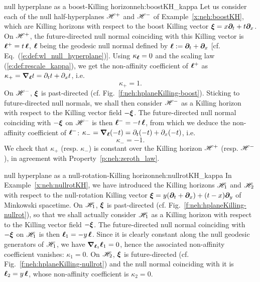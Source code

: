 \begin{texample}{null hyperplane as a boost-Killing horizon}{neh:boostKH_kappa}
Let us consider each of the null half-hyperplanes $\mathscr{H}^+$
and $\mathscr{H}^-$ of Example~\ref{x:neh:boostKH}, which are Killing horizons with
respect to the boost Killing vector $\bm{\xi} = x \bm{\partial}_t + t \bm{\partial}_x$. On
$\mathscr{H}^+$, the future-directed null normal coinciding with this Killing vector
is $\bm{\ell}^+ = t\,  \bm{\ell}$, $\bm{\ell}$ being the geodesic null normal defined by
$\bm{\ell}:= \bm{\partial}_t + \bm{\partial}_x$ [cf. Eq.~(\ref{e:def:wl_null_hyperplane})].
Using $\kappa_{\bm{\ell}} = 0$ and the scaling law (\ref{e:def:rescale_kappa}),
we get the non-affinity
coefficient of $\bm{\ell}^+$ as $\kappa_+= \bm{\nabla}_{\bm{\ell}} t = \partial_t t + \partial_x t$, i.e.
\[
    \kappa_+ = 1 .
\]
On $\mathscr{H}^-$, $\bm{\xi}$ is past-directed (cf. Fig.~\ref{f:neh:hplaneKilling-boost}).
Sticking to future-directed null normals, we shall then consider $\mathscr{H}^-$
as a Killing horizon with respect to the Killing vector field $-\bm{\xi}$.
The future-directed null normal coinciding with $-\bm{\xi}$ on $\mathscr{H}^-$ is then
$\bm{\ell}^- = -t\,  \bm{\ell}$, from which we deduce the non-affinity
coefficient of $\bm{\ell}^-$: $\kappa_-= \bm{\nabla}_{\bm{\ell}} (-t) = \partial_t (-t) + \partial_x (-t)$, i.e.
\[
    \kappa_- = -1 .
\]
We check that $\kappa_+$ (resp.  $\kappa_-$) is constant over the Killing horizon $\mathscr{H}^+$ (resp. $\mathscr{H}^-$), in agreement with Property~\ref{p:neh:zeroth_law}.
\end{texample}

\begin{texample}{null hyperplane as a null-rotation-Killing horizon}{neh:nullrotKH_kappa}
In Example~\ref{x:neh:nullrotKH}, we have introduced the Killing horizons
$\mathscr{H}_1$ and $\mathscr{H}_2$ with respect to the null-rotation Killing vector
$\bm{\xi} = y( \bm{\partial}_t + \bm{\partial}_x ) + (t-x)\bm{\partial}_y$ of Minkowski spacetime.
On $\mathscr{H}_1$, $\bm{\xi}$ is past-directed (cf. Fig.~\ref{f:neh:hplaneKilling-nullrot}),
so that we shall actually consider $\mathscr{H}_1$
as a Killing horizon with respect to the Killing vector field $-\bm{\xi}$.
The future-directed null normal coinciding with $-\bm{\xi}$ on $\mathscr{H}_1$ is then
$\bm{\ell}_1 = - y\, \bm{\ell}$. Since it is clearly constant along the null geodesic generators
of $\mathscr{H}_1$, we have $\bm{\nabla}_{\bm{\ell}_1}\bm{\ell}_1 = 0$, hence the
associated non-affinity coefficient vanishes: $\kappa_1 = 0$.
On $\mathscr{H}_2$, $\bm{\xi}$ is future-directed (cf. Fig.~\ref{f:neh:hplaneKilling-nullrot})
and the null normal coinciding with it is $\bm{\ell}_2 =  y\,  \bm{\ell}$, whose non-affinity
coefficient is $\kappa_2 = 0$.
\end{texample}

